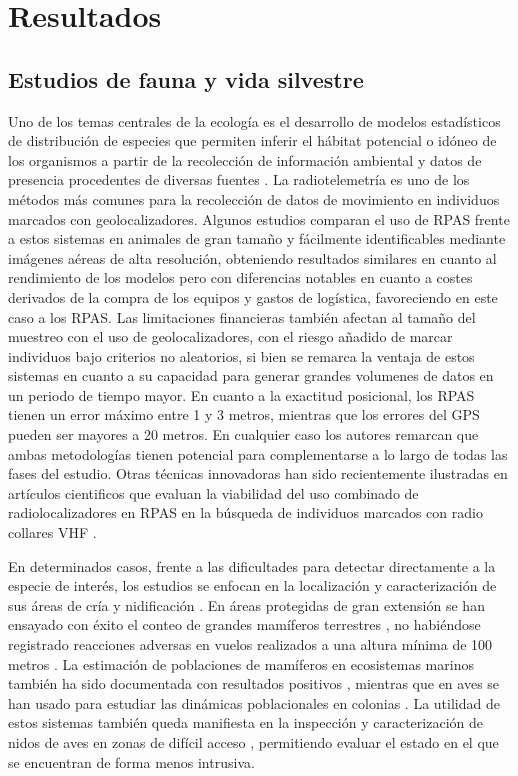 \documentclass[onecolumn]{extarticle}
\begin{document}
\section{Resultados}\label{resultados}

\subsection{Estudios de fauna y vida
silvestre}\label{estudios-de-fauna-y-vida-silvestre}

Uno de los temas centrales de la ecología es el desarrollo de modelos
estadísticos de distribución de especies que permiten inferir el hábitat
potencial o idóneo de los organismos a partir de la recolección de
información ambiental y datos de presencia procedentes de diversas
fuentes \citep{Mateo2011}. La radiotelemetría es uno de los métodos más
comunes para la recolección de datos de movimiento en individuos
marcados con geolocalizadores. Algunos estudios comparan el uso de RPAS
frente a estos sistemas \citep{Mulero-Pazmany2015} en animales de gran
tamaño y fácilmente identificables mediante imágenes aéreas de alta
resolución, obteniendo resultados similares en cuanto al rendimiento de
los modelos pero con diferencias notables en cuanto a costes derivados
de la compra de los equipos y gastos de logística, favoreciendo en este
caso a los RPAS. Las limitaciones financieras también afectan al tamaño
del muestreo con el uso de geolocalizadores, con el riesgo añadido de
marcar individuos bajo criterios no aleatorios, si bien se remarca la
ventaja de estos sistemas en cuanto a su capacidad para generar grandes
volumenes de datos en un periodo de tiempo mayor. En cuanto a la
exactitud posicional, los RPAS tienen un error máximo entre 1 y 3
metros, mientras que los errores del GPS pueden ser mayores a 20 metros.
En cualquier caso los autores remarcan que ambas metodologías tienen
potencial para complementarse a lo largo de todas las fases del estudio.
Otras técnicas innovadoras han sido recientemente ilustradas en
artículos cientificos que evaluan la viabilidad del uso combinado de
radiolocalizadores en RPAS en la búsqueda de individuos marcados con
radio collares VHF
\citep{Korner2010, Bayram2016, Cliff2015, Leonardo2013}.

En determinados casos, frente a las dificultades para detectar
directamente a la especie de interés, los estudios se enfocan en la
localización y caracterización de sus áreas de cría y nidificación
\citep{VanAndel2015}. En áreas protegidas de gran extensión se han
ensayado con éxito el conteo de grandes mamíferos terrestres , no
habiéndose registrado reacciones adversas en vuelos realizados a una
altura mínima de 100 metros \citep{Vermeulen2013}. La estimación de
poblaciones de mamíferos en ecosistemas marinos también ha sido
documentada con resultados positivos \citep{Hodgson2013}, mientras que
en aves se han usado para estudiar las dinámicas poblacionales en
colonias \citep{Sarda-Palomera2012}. La utilidad de estos sistemas
también queda manifiesta en la inspección y caracterización de nidos de
aves en zonas de difícil acceso \citep{Weissensteiner2015}, permitiendo
evaluar el estado en el que se encuentran de forma menos intrusiva.
\end{document}
